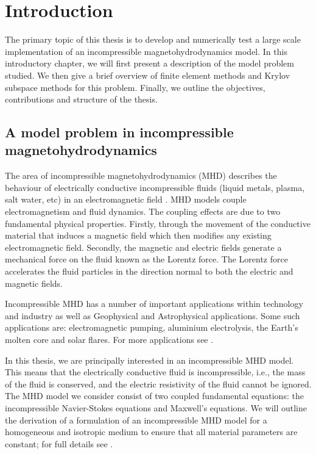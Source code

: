 \setcounter{page}{1}

\chapter{Introduction}

The primary topic of this thesis is to develop and numerically test a large scale implementation of an incompressible magnetohydrodynamics model. In this introductory chapter, we will first  present a description of the model problem studied. We then give a brief overview of finite element methods and Krylov subspace methods for this problem. Finally, we outline the objectives, contributions and structure of the thesis.

\section{A model problem in incompressible magnetohydrodynamics}

The area of incompressible magnetohydrodynamics (MHD)  describes the behaviour of electrically conductive incompressible fluids (liquid metals, plasma, salt water, etc) in an electromagnetic field \cite{davidson2001introduction,le2006mathematical,muller2001magnetofluiddynamics}. MHD models couple electromagnetism and fluid dynamics. The coupling effects are due to two fundamental physical properties. Firstly, through the movement of the conductive material that induces a magnetic field which then modifies any existing electromagnetic field. Secondly, the magnetic and electric fields generate a mechanical force on the fluid known as the Lorentz force. The Lorentz force accelerates the fluid particles in the direction normal to both the electric and magnetic fields.

Incompressible MHD has a number of important applications within technology and industry as well as Geophysical and Astrophysical applications. Some such applications are: electromagnetic pumping, aluminium electrolysis, the Earth's molten core and solar flares. For more applications see \cite{muller2001magnetofluiddynamics}.

In this thesis, we are principally interested in an incompressible MHD model. This means that the electrically conductive fluid is incompressible, i.e., the mass of the fluid is conserved, and the electric resistivity of the fluid cannot be ignored. The MHD model we consider consist of two coupled fundamental equations: the incompressible Navier-Stokes equations and Maxwell's equations. We will outline the derivation of a formulation of an incompressible MHD model for a homogeneous and isotropic medium to ensure that all material parameters are constant; for full details see \cite{armero1996long}.

